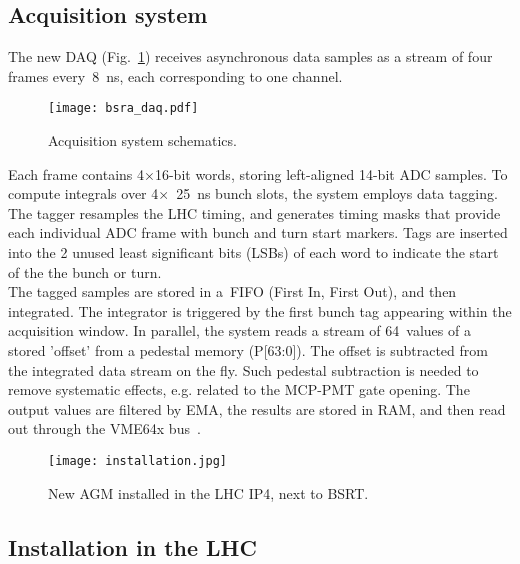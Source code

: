 \subsection{Acquisition system}
The new DAQ (Fig.~\ref{fig:bsra_daq}) receives asynchronous data samples as a stream of four frames every~\SI{8}{\nano s}, each corresponding to one channel.
%
\begin{figure}[!t]
    \centering
    \texttt{[image: bsra\_daq.pdf]}
    \caption{Acquisition system schematics.}
    \label{fig:bsra_daq}
\end{figure}
%
Each frame contains 4$\times$16-bit words, storing left-aligned 14-bit ADC samples. 
%
To compute integrals over 4$\times$~\SI{25}{\nano\second} bunch slots, the system employs data tagging. 
%
The tagger resamples the LHC timing, and generates timing masks that  provide each individual ADC frame with %
bunch and turn start markers. 
%
Tags are inserted into the  2 unused least significant bits (LSBs) of each word to indicate the start of the  the bunch or turn.
\\
%
The tagged samples are stored in a~FIFO (First In, First Out), and then integrated. 
%
The integrator is triggered %
by the first bunch tag appearing within the acquisition window.
%
In parallel, the system reads a stream of 64~values of a stored 'offset' from a pedestal memory (P[63:0]).
%
The offset is subtracted  from the integrated data stream on the fly.
%
Such pedestal subtraction is needed to remove systematic effects, e.g. related to the MCP-PMT gate opening. 
%
The output values are filtered by EMA, the results are stored  in RAM, and then read out through the VME64x bus~\cite{my_thesis}.

\begin{figure}[!tbh]
    \centering
    \texttt{[image: installation.jpg]}
    \caption{New AGM installed in the LHC IP4, next to BSRT.}
    \label{fig:installation}
\end{figure}
\vspace{-5mm}

\subsection{Installation in the LHC}

